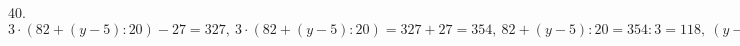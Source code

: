 40. $3\cdot(82+(y-5):20)-27=327,\ 3\cdot(82+(y-5):20)=327+27=354,\ 82+(y-5):20=354:3=118,\ (y-5):20=118-82=36,\ y-5=36\cdot20=720,\ y=720+5=725.$\\
